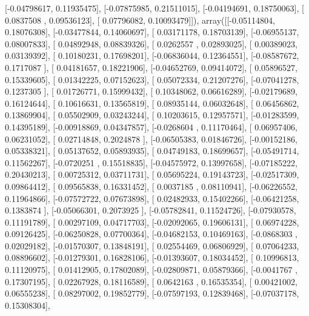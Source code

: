 \documentclass{article}
\begin{document}
       [-0.04798617,  0.11935475],
       [-0.07875985,  0.21511015],
       [-0.04194691,  0.18750063],
       [ 0.0837508 ,  0.09536123],
       [ 0.07796082,  0.10093479]]), array([[-0.05114804,  0.18076308],
       [-0.03477844,  0.14060697],
       [ 0.03171178,  0.18703139],
       [-0.06955137,  0.08007833],
       [ 0.04892948,  0.08839326],
       [ 0.0262557 ,  0.02893025],
       [ 0.00389023,  0.03139392],
       [ 0.10180231,  0.17698201],
       [-0.06836044,  0.12364551],
       [-0.08587672,  0.1717087 ],
       [ 0.04181657,  0.18221906],
       [-0.04652769,  0.09414072],
       [ 0.05896527,  0.15339605],
       [ 0.01342225,  0.07152623],
       [ 0.05072334,  0.21207276],
       [-0.07041278,  0.1237305 ],
       [ 0.01726771,  0.15999432],
       [ 0.10348062,  0.06616289],
       [-0.02179689,  0.16124644],
       [ 0.10616631,  0.13565819],
       [ 0.08935144,  0.06032648],
       [ 0.06456862,  0.13869904],
       [ 0.05502909,  0.03243244],
       [ 0.10203615,  0.12957571],
       [-0.01283599,  0.14395189],
       [-0.00918869,  0.04347857],
       [-0.0268604 ,  0.11170464],
       [ 0.06957406,  0.06231052],
       [ 0.02714848,  0.2024878 ],
       [-0.06505383,  0.01846726],
       [-0.00152186,  0.05338321],
       [ 0.05137652,  0.05893935],
       [ 0.04749183,  0.18699657],
       [-0.05491714,  0.11562267],
       [-0.0720251 ,  0.15518835],
       [-0.04575972,  0.13997658],
       [-0.07185222,  0.20430213],
       [ 0.00725312,  0.03711731],
       [ 0.05695224,  0.19143723],
       [-0.02517309,  0.09864412],
       [ 0.09565838,  0.16331452],
       [ 0.0037185 ,  0.08110941],
       [-0.06226552,  0.11964866],
       [-0.07572722,  0.07673898],
       [ 0.02482933,  0.15402266],
       [-0.06421258,  0.1383874 ],
       [-0.05066301,  0.2073925 ],
       [-0.05782841,  0.11524726],
       [-0.07930578,  0.11191789],
       [ 0.00297109,  0.04717703],
       [-0.02092065,  0.19606131],
       [ 0.06974228,  0.09126425],
       [-0.06250828,  0.07700364],
       [-0.04682153,  0.10469163],
       [-0.0868303 ,  0.02029182],
       [-0.01570307,  0.13848191],
       [ 0.02554469,  0.06806929],
       [ 0.07064233,  0.08896602],
       [-0.01279301,  0.16828106],
       [-0.01393607,  0.18034452],
       [ 0.10996813,  0.11120975],
       [ 0.01412905,  0.17802089],
       [-0.02809871,  0.05879366],
       [-0.0041767 ,  0.17307195],
       [ 0.02267928,  0.18116589],
       [ 0.0642163 ,  0.16535354],
       [ 0.00421002,  0.06555238],
       [ 0.08297002,  0.19852779],
       [-0.07597193,  0.12839468],
       [-0.07037178,  0.15308304],
\end{document}
